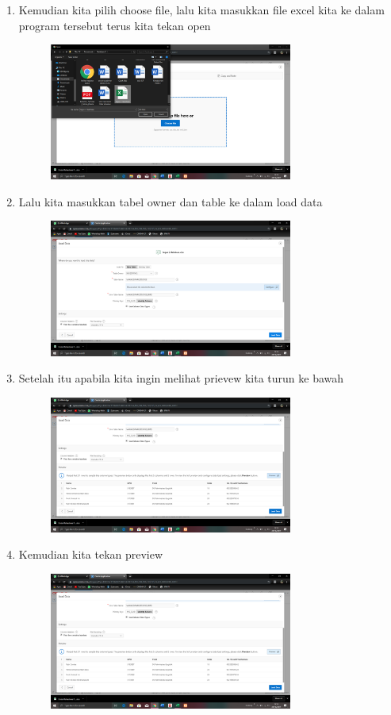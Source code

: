 \documentclass{article}
\begin{document}
\begin{enumerate}
\begin{figure}[h]
        \end{figure}
    \newpage \item Kemudian kita pilih choose file, lalu kita masukkan file excel kita ke dalam program tersebut terus kita tekan open
    \begin{figure}[h]
    \centerline{\includegraphics[width=8cm]{image/8.png}}
    \end{figure}
    \item Lalu kita masukkan tabel owner dan table ke dalam load data
    \begin{figure}[h]
    \centerline{\includegraphics[width=8cm]{image/9.png}}
    \end{figure}
   \newpage \item Setelah itu apabila kita ingin melihat prievew kita turun ke bawah 
    \begin{figure}[h]
    \centerline{\includegraphics[width=8cm]{image/10.png}}
    \end{figure}
    \item Kemudian kita tekan preview 
    \begin{figure}[h]
    \centerline{\includegraphics[width=8cm]{image/11.png}}

\end{figure}
\end{enumerate}
\end{document}
